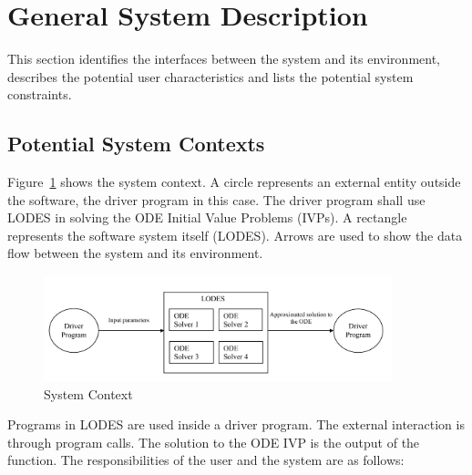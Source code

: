 \documentclass[12pt]{article}
\newcommand{\famname}{LODES} %
\begin{document}
\section{General System Description}

This section identifies the interfaces between the system and its environment,
describes the potential user characteristics and lists the potential system
constraints.

\subsection{Potential System Contexts}

Figure~\ref{Fig_SystemContext} shows the system context.  A circle represents an
external entity outside the software, the driver program in this case. The driver program
shall use \famname{} in solving the ODE Initial Value Problems (IVPs).
A rectangle represents the software system itself (\famname{}). 
Arrows are used to show the data flow between the system and its environment.

\begin{figure}[h!]
\begin{center}
 \includegraphics[width=0.9\textwidth, height=0.20\textheight]{SystemContextFigure}
\caption{System Context}
\label{Fig_SystemContext} 
\end{center}
\end{figure}

Programs in \famname{} are used inside a driver program.  The external interaction is through
program calls. The solution to the ODE IVP is the output of the function. 
The responsibilities of the user and the system are as follows:
\end{document}
